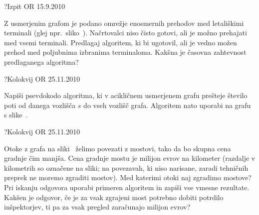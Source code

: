 \begin{naloga}{?}{Izpit OR 15.9.2010}
\begin{vprasanje}
Z usmerjenim grafom je podano omrežje enosmernih prehodov
med letališkimi terminali (glej npr.~sliko~).
Načrtovalci niso čisto gotovi, ali je možno prehajati med vsemi terminali.
Predlagaj algoritem, ki bi ugotovil,
ali je vedno možen prehod med poljubnima izbranima terminaloma.
Kakšna je časovna zahtevnost predlaganega algoritma?

\end{vprasanje}
\begin{odgovor}
\end{odgovor}
\end{naloga}


\begin{naloga}{?}{Kolokvij OR 25.11.2010}
\begin{vprasanje}[stpoti]
Napiši psevdokodo algoritma,
ki v acikličnem usmerjenem grafu prešteje število poti
od danega vozlišča $s$ do vseh vozlišč grafa.
Algoritem nato uporabi na grafu s slike~\fig{}.

\begin{slika}
\pgfslika
{}
\end{slika}
\end{vprasanje}
\begin{odgovor}
\end{odgovor}
\end{naloga}


\begin{naloga}{?}{Kolokvij OR 25.11.2010}
\begin{vprasanje}[otoki]
Otoke z grafa na sliki~\fig{} želimo povezati z mostovi,
tako da bo skupna cena grad\-nje čim manjša.
Cena gradnje mostu je milijon evrov na kilometer
(razdalje v kilometrih so označene na sliki;
na povezavah, ki niso narisane,
zaradi tehničnih preprek ne moremo zgraditi mostov).
Med katerimi otoki naj zgradimo mostove?
Pri iskanju odgovora uporabi primeren algoritem
in zapiši vse vmesne rezultate.
Kakšen je odgovor,
če je za vsak zgrajeni most potrebno dobiti potrdilo inšpektorjev,
ti pa za vsak pregled zaračunajo milijon evrov?

\begin{slika}
\pgfslika
{}
\end{slika}
\end{vprasanje}
\begin{odgovor}
\end{odgovor}
\end{naloga}


